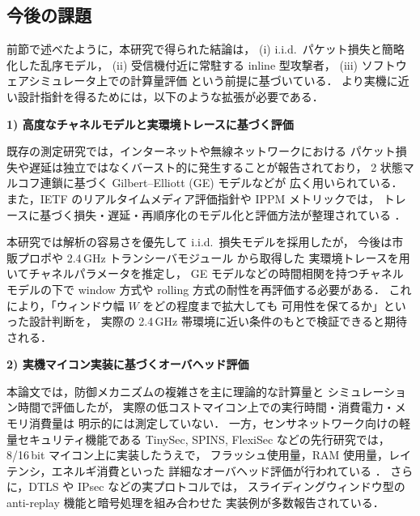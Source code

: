 \documentclass[twocolumn,10pt,a4paper]{jsarticle}
\begin{document}
\subsection{今後の課題}

\label{subsec:future-work}

前節で述べたように，本研究で得られた結論は，
(i) i.i.d.\ パケット損失と簡略化した乱序モデル，
(ii) 受信機付近に常駐する inline 型攻撃者，
(iii) ソフトウェアシミュレータ上での計算量評価
という前提に基づいている．
より実機に近い設計指針を得るためには，以下のような拡張が必要である．

\vspace{0.5em}
\noindent\textbf{1) 高度なチャネルモデルと実環境トレースに基づく評価}\par
既存の測定研究では，インターネットや無線ネットワークにおける
パケット損失や遅延は独立ではなくバースト的に発生することが報告されており，
2 状態マルコフ連鎖に基づく Gilbert--Elliott (GE) モデルなどが
広く用いられている\cite{Jiang2000Modeling,Hasslinger2008GE}．
また，IETF のリアルタイムメディア評価指針や IPPM メトリックでは，
トレースに基づく損失・遅延・再順序化のモデル化と評価方法が整理されている
\cite{RFC8868,IETF-RMCAT-Eval,rfc4737}．

本研究では解析の容易さを優先して i.i.d.\ 損失モデルを採用したが，
今後は市販プロポや 2.4\,GHz トランシーバモジュール
\cite{RC2p4GSlides,TamiyaRCGuide,Nordic_nRF24L01}から取得した
実環境トレースを用いてチャネルパラメータを推定し，
GE モデルなどの時間相関を持つチャネルモデルの下で
window 方式や rolling 方式の耐性を再評価する必要がある．
これにより，「ウィンドウ幅 $W$ をどの程度まで拡大しても
可用性を保てるか」といった設計判断を，
実際の 2.4\,GHz 帯環境に近い条件のもとで検証できると期待される．

\vspace{0.5em}
\noindent\textbf{2) 実機マイコン実装に基づくオーバヘッド評価}\par
本論文では，防御メカニズムの複雑さを主に理論的な計算量と
シミュレーション時間で評価したが，
実際の低コストマイコン上での実行時間・消費電力・メモリ消費量は
明示的には測定していない．
一方，センサネットワーク向けの軽量セキュリティ機能である
TinySec, SPINS, FlexiSec などの先行研究では，
8/16\,bit マイコン上に実装したうえで，
フラッシュ使用量，RAM 使用量，レイテンシ，エネルギ消費といった
詳細なオーバヘッド評価が行われている
\cite{TinySec,PerrigSPINS,JinwalaFlexiSec}．
さらに，DTLS や IPsec などの実プロトコルでは，
スライディングウィンドウ型の anti-replay 機能と暗号処理を組み合わせた
実装例が多数報告されている\cite{RFC6347DTLS,rfc4303}．
\end{document}
